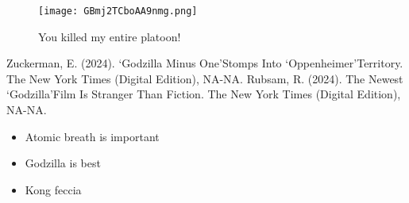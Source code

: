 
\begin{figure}
    \centering %
    \texttt{[image: GBmj2TCboAA9nmg.png]} %
    \caption{You killed my entire platoon!}
    \label{fig:minus_one}
\end{figure}

\begin{thebibliography}{999}
    Zuckerman, E. (2024). ‘Godzilla Minus One’Stomps Into ‘Oppenheimer’Territory. The New York Times (Digital Edition), NA-NA.
    Rubsam, R. (2024). The Newest ‘Godzilla’Film Is Stranger Than Fiction. The New York Times (Digital Edition), NA-NA.
\end{thebibliography}


\begin{itemize}
    \item Atomic breath is important %
    \item Godzilla is best
    \item Kong feccia
\end{itemize}

